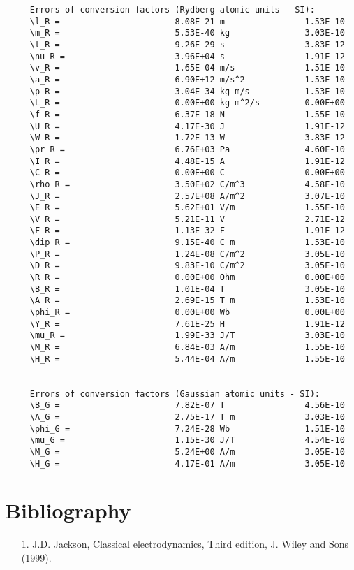 \documentclass[12pt,a4paper]{article}
\begin{document}
\begin{verbatim}
     Errors of conversion factors (Rydberg atomic units - SI):
     \l_R =                       8.08E-21 m                1.53E-10
     \m_R =                       5.53E-40 kg               3.03E-10
     \t_R =                       9.26E-29 s                3.83E-12
     \nu_R =                      3.96E+04 s                1.91E-12
     \v_R =                       1.65E-04 m/s              1.51E-10
     \a_R =                       6.90E+12 m/s^2            1.53E-10
     \p_R =                       3.04E-34 kg m/s           1.53E-10
     \L_R =                       0.00E+00 kg m^2/s         0.00E+00
     \f_R =                       6.37E-18 N                1.55E-10
     \U_R =                       4.17E-30 J                1.91E-12
     \W_R =                       1.72E-13 W                3.83E-12
     \pr_R =                      6.76E+03 Pa               4.60E-10
     \I_R =                       4.48E-15 A                1.91E-12
     \C_R =                       0.00E+00 C                0.00E+00
     \rho_R =                     3.50E+02 C/m^3            4.58E-10
     \J_R =                       2.57E+08 A/m^2            3.07E-10
     \E_R =                       5.62E+01 V/m              1.55E-10
     \V_R =                       5.21E-11 V                2.71E-12
     \F_R =                       1.13E-32 F                1.91E-12
     \dip_R =                     9.15E-40 C m              1.53E-10
     \P_R =                       1.24E-08 C/m^2            3.05E-10
     \D_R =                       9.83E-10 C/m^2            3.05E-10
     \R_R =                       0.00E+00 Ohm              0.00E+00
     \B_R =                       1.01E-04 T                3.05E-10
     \A_R =                       2.69E-15 T m              1.53E-10
     \phi_R =                     0.00E+00 Wb               0.00E+00
     \Y_R =                       7.61E-25 H                1.91E-12
     \mu_R =                      1.99E-33 J/T              3.03E-10
     \M_R =                       6.84E-03 A/m              1.55E-10
     \H_R =                       5.44E-04 A/m              1.55E-10


     Errors of conversion factors (Gaussian atomic units - SI):
     \B_G =                       7.82E-07 T                4.56E-10
     \A_G =                       2.75E-17 T m              3.03E-10
     \phi_G =                     7.24E-28 Wb               1.51E-10
     \mu_G =                      1.15E-30 J/T              4.54E-10
     \M_G =                       5.24E+00 A/m              3.05E-10
     \H_G =                       4.17E-01 A/m              3.05E-10
\end{verbatim}

\newpage


\section{\color{coral}Bibliography}
\begin{enumerate}

\item
[1.] J.D. Jackson, Classical electrodynamics, Third edition,
J. Wiley and Sons (1999).

\end{enumerate}
\end{document}
